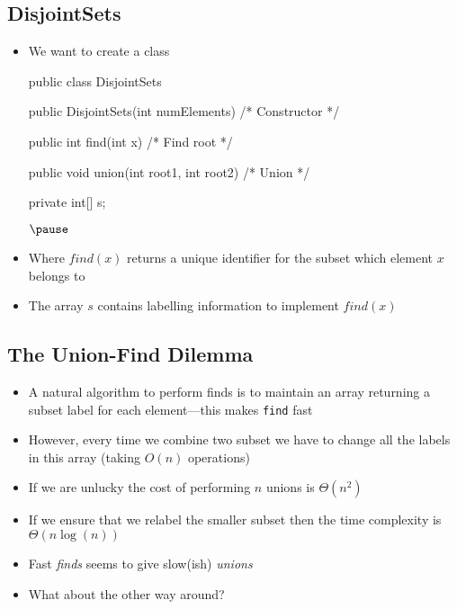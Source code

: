 
\begin{slide}
\section[-1]{DisjointSets}

\begin{PauseHighLight}
  \begin{itemize}
  \item We want to create a class
    \begin{java}
public class DisjointSets
{
    public DisjointSets(int numElements) {/* Constructor */}

    public int find(int x) {/* Find root */}

    public void union(int root1, int root2) {/* Union */}

    private int[] s;
}$\pause$
    \end{java}
  \item Where \jl$find(x)$ returns a unique identifier for the subset
    which element \jl$x$ belongs to\pause
  \item The array \jl$s$ contains labelling information to implement
    \jl$find(x)$\pause
  \end{itemize}
\end{PauseHighLight}

\end{slide}


\begin{slide}
\section[-1]{The Union-Find Dilemma}

\begin{PauseHighLight}
  \begin{itemize}
  \item A natural algorithm to perform finds is to maintain an
    array returning a subset label for each element\pause---this makes
    \texttt{find} fast\pause
  \item However, every time we combine two subset we have to change all
    the labels in this array (taking $O(n)$ operations)\pause
  \item If we are unlucky the cost of performing $n$ unions is
    $\Theta(n^2)$\pause
  \item If we ensure that we relabel the smaller subset then the time
    complexity is $\Theta(n \log(n))$\pause
  \item Fast \textit{finds} seems to give slow(ish) \textit{unions}\pause
  \item What about the other way around?\pause
  \end{itemize}
\end{PauseHighLight}

\end{slide}

